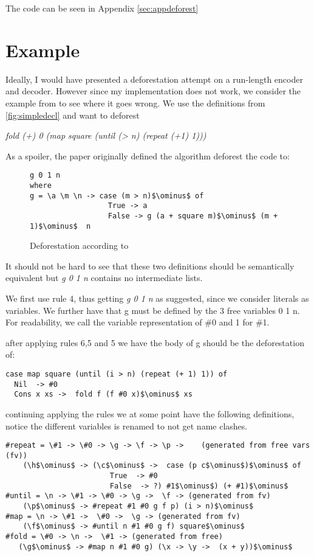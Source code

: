 \documentclass[a4paper, openany]{article}
\begin{document}
The code can be seen in Appendix \ref{sec:appdeforest}

\section{Example}
\label{sec:example}
Ideally, I would have presented a deforestation attempt on a run-length encoder and decoder. However since my implementation does not work, we consider the example from \cite{hodeforest} to see where it goes wrong.
We use the definitions from \ref{fig:simpledecl} and want to deforest

\emph{fold (+) 0 (map square (until (> n) (repeat (+1) 1)))}

As a spoiler, the paper originally defined the algorithm deforest the code to:

\begin{figure}[h!]
\begin{lstlisting}[mathescape=true]
g 0 1 n
where
g = \a \m \n -> case (m > n)$\ominus$ of
                  True -> a
                  False -> g (a + square m)$\ominus$ (m + 1)$\ominus$  n
\end{lstlisting}
\caption{Deforestation according to \cite{hodeforest}}
\label{fig:target}
\end{figure}

It should not be hard to see that these two definitions should be semantically equivalent but \emph{g 0 1 n} contains no intermediate lists.

We first use rule 4, thus getting \emph{g 0 1 n} as suggested, since we consider literals as variables.
We further have that g must be defined by the 3 free variables 0 1 n. For readability, we call the variable representation of \#0 and 1 for \#1.

after applying rules 6,5 and 5 we have the body of g should be the deforestation of:
\begin{lstlisting}[mathescape=true]
case map square (until (i > n) (repeat (+ 1) 1)) of
  Nil  -> #0
  Cons x xs ->  fold f (f #0 x)$\ominus$ xs
\end{lstlisting}

continuing applying the rules we at some point have the following definitions, notice the different variables
is renamed to not get name clashes.
\begin{lstlisting}[mathescape=true]
#repeat = \#1 -> \#0 -> \g -> \f -> \p ->    (generated from free vars (fv))
    (\h$\ominus$ -> (\c$\ominus$ ->  case (p c$\ominus$)$\ominus$ of
                        True  -> #0
                        False  -> ?) #1$\ominus$) (+ #1)$\ominus$
#until = \n -> \#1 -> \#0 -> \g ->  \f -> (generated from fv)
    (\p$\ominus$ -> #repeat #1 #0 g f p) (i > n)$\ominus$
#map = \n -> \#1 ->  \#0 ->  \g -> (generated from fv)
    (\f$\ominus$ -> #until n #1 #0 g f) square$\ominus$
#fold = \#0 -> \n ->  \#1 -> (generated from free)
   (\g$\ominus$ -> #map n #1 #0 g) (\x -> \y ->  (x + y))$\ominus$
\end{lstlisting}
\end{document}
